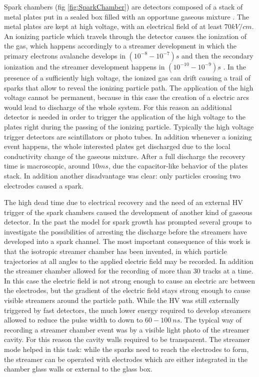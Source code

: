 Spark chambers (fig \ref{fig:SparkChamber}) are detectors composed of a stack of metal plates put in a sealed box filled with an opportune gaseous mixture \cite{wenzel:1966}.
The metal plates are kept at high voltage, with an electrical field of at least $70 kV/cm$.
An ionizing particle which travels through the detector causes the ionization of the gas, which happens accordingly to a streamer development in which the primary electrons avalanche develops in $(10^{-8}-10^{-7})s$ and then the secondary ionization and the streamer development happens in $(10^{-10}-10^{-9})s$ \cite{wenzel:1966}.
In the presence of a sufficiently high voltage, the ionized gas can drift causing a trail of sparks that allow to reveal the ionizing particle path.
The application of the high voltage cannot be permanent, because in this case the creation of a electric arcs would lead to discharge of the whole system.
For this reason an additional detector is needed in order to trigger the application of the high voltage to the plates right during the passing of the ionizing particle.
Typically the high voltage trigger detectors are scintillators or photo tubes. 
In addition whenever a ionizing event happens, the whole interested plates get discharged due to the local conductivity change of the gaseous mixture.
After a full discharge the recovery time is macroscopic, around $10ms$, due the capacitor-like behavior of the plates stack.
In addition another disadvantage was clear: only particles crossing two electrodes caused a spark.

The high dead time due to electrical recovery and the need of an external HV trigger of the spark chambers caused the development of another kind of gaseous detector.
In the past the model for spark growth has prompted several groups \cite{chicovani:1964} to investigate the possibilities of arresting the discharge before the streamers have developed into a spark channel.
The most important consequence of this work is that the isotropic streamer chamber has been invented, in which particle trajectories at all angles to the applied electric field may be recorded.
In addition the streamer chamber allowed for the recording of more than $30$ tracks at a time.
In this case the electric field is not strong enough to cause an electric arc between the electrodes, but the gradient of the electric field stays strong enough to cause visible streamers around the particle path.
While the HV was still externally triggered by fast detectors, the much lower energy required to develop streamers allowed to reduce the pulse width to down to $60-100\ ns$.
The typical way of recording a streamer chamber event was by a visible light photo of the streamer cavity.
For this reason the cavity walls required to be transparent.
The streamer mode helped in this task: while the sparks need to reach the electrodes to form, the streamer can be operated with electrodes which are either integrated in the chamber glass walls or external to the glass box.

